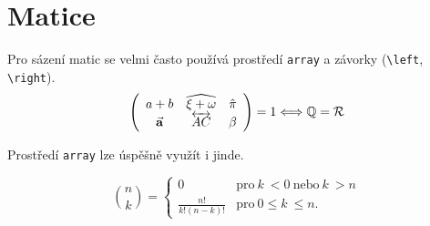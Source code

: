 \documentclass[a4paper, twocolumn, 11pt]{article}
\theoremstyle{definition}
\begin{document}
\section{Matice}

Pro sázení matic se velmi často používá prostředí \verb|array| a závorky (\verb|\left|, \verb|\right|). \setlength{\parskip}{0.1em}
$$
\left(
\begin{array}{ccc}
    a + b & \widehat{\xi + \omega} & \hat{\pi}  \\
    \Vec{\mathbf{a}} & \overleftrightarrow{AC} & \beta
\end{array}
\right)
= 1\hspace{-1mm}\iff\\ \mathbb{Q} = \mathcal{R} \nonumber
$$
\par \setlength{\parindent}{0em} \setlength{\parskip}{-0.5em}
Prostředí \verb|array| lze úspěšně využít i jinde.

\setlength{\parskip}{1em}
$$
\binom{n}{k}
=
\left\{
\begin{array}{cl}
    0 & \text{pro}\ k\ < 0\ \text{nebo}\ k\ > n \\[0.05em]
    \frac{n!}{k!(n-k)!} & \text{pro}\ 0 \leq k\ \leq n.
\end{array}
\right. \nonumber
$$
\end{document}
